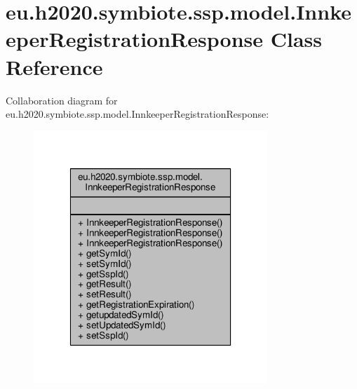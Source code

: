 \hypertarget{classeu_1_1h2020_1_1symbiote_1_1ssp_1_1model_1_1InnkeeperRegistrationResponse}{}\section{eu.\+h2020.\+symbiote.\+ssp.\+model.\+Innkeeper\+Registration\+Response Class Reference}
\label{classeu_1_1h2020_1_1symbiote_1_1ssp_1_1model_1_1InnkeeperRegistrationResponse}


Collaboration diagram for eu.\+h2020.\+symbiote.\+ssp.\+model.\+Innkeeper\+Registration\+Response\+:
\nopagebreak
\begin{figure}[H]
\begin{center}
\leavevmode
\includegraphics[width=250pt]{classeu_1_1h2020_1_1symbiote_1_1ssp_1_1model_1_1InnkeeperRegistrationResponse__coll__graph}
\end{center}
\end{figure}
